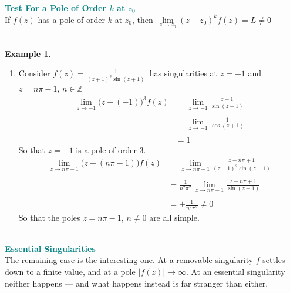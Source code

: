 \documentclass[11pt,a4paper]{article}
\theoremstyle{definition}
\newtheorem{example}[thm]{Example}
\begin{document}
\textbf{\textcolor{teal}{Test For a Pole of Order $k$ at $z_0$}}\\
If $f(z)$ has a pole of order $k$ at $z_0$, then $\,\boxed{ \lim\limits_{z \rightarrow z_0} (z - z_0)^k f(z) = L\neq 0}$\\\\








\pagebreak
\begin{example}
\begin{enumerate}
\item Consider $f(z) = \frac{1}{(z  + 1)^2 \sin (z + 1)}\,$ has singularities at $z = -1$ and $z = n \pi - 1, \, n\in \mathbb{Z}$
\begin{align*}
\lim\limits_{z\rightarrow -1} \big(z - (-1)\big)^3 f(z) & = \lim\limits_{z\rightarrow -1} \frac{z + 1}{\sin (z + 1)}\\\\
& = \lim\limits_{z\rightarrow -1}\frac{1}{\cos (z + 1)}\\\\
& = 1
\end{align*}
So that $z = -1$ is a pole of order $3$.\\


\begin{align*}
\lim_{z\rightarrow n\pi - 1} \big( z - (n\pi - 1)\big) f(z) &  = \lim_{z\rightarrow n\pi - 1}\frac{z - n\pi  + 1}{(z + 1)^2\sin (z + 1)}\\\\
& = \frac{1}{n^2\pi^2}\,\lim_{z\rightarrow n\pi - 1}\frac{z - n\pi + 1}{\sin (z + 1)}\\\\
&  = \pm \frac{1}{n^2\pi^2}\neq 0
\end{align*}
So that the poles $z  = n\pi - 1, \, n\neq 0$ are all simple.\\\\
\end{enumerate}
\end{example}






\textbf{\textcolor{teal}{Essential Singularities}}\\
The remaining case is the interesting one. At a removable singularity $f$ settles
down to a finite value, and at a pole $\left|f(z)\right| \rightarrow \infty$. At
an essential singularity neither happens --- and what happens instead is far
stranger than either.
\end{document}
